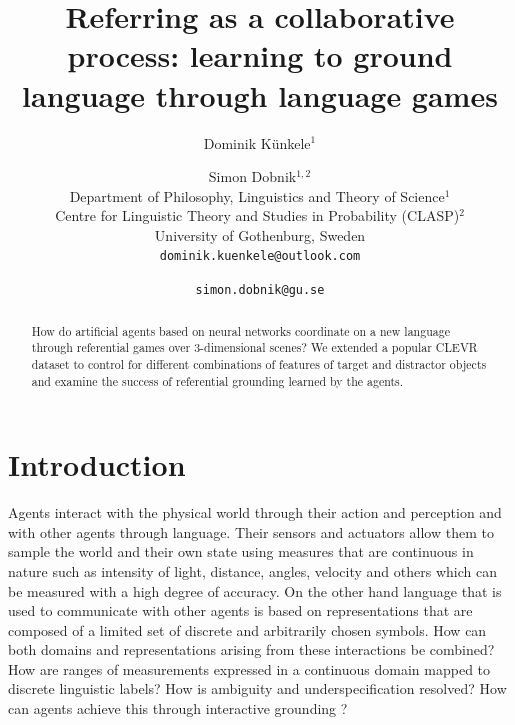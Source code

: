 \documentclass[11pt]{article}
\title{Referring as a collaborative process: learning to ground \\ language through language games} %
\author{Dominik Künkele$^{1}$ \and Simon Dobnik$^{1,2}$ \\
        Department of Philosophy, Linguistics and Theory of Science$^{1}$ \\ 
        Centre for Linguistic Theory and Studies in Probability (CLASP)$^{2}$ \\
        University of Gothenburg, Sweden \\
        \texttt{dominik.kuenkele@outlook.com} \and \texttt{simon.dobnik@gu.se}}
\begin{document}
\maketitle
\begin{abstract}
  How do artificial agents based on neural networks coordinate on a new language through referential games over 3-dimensional scenes?
  We extended a popular CLEVR dataset to control for different combinations of features of target and distractor objects and examine the success of referential grounding learned by the agents.
\end{abstract}

\section{Introduction}

Agents interact with the physical world through their action and perception and with other agents through language.
Their sensors and actuators %
allow them to sample the world and their own state using measures that are continuous in nature such as intensity of light, distance, angles, velocity and others which can be measured with a high degree of accuracy.
On the other hand language that is used to communicate with other agents is based on representations that are composed of a limited set of discrete and arbitrarily chosen symbols.
How can both domains and representations arising from these interactions be combined? How are ranges of measurements expressed in a continuous domain mapped to discrete linguistic labels?
How is ambiguity and underspecification resolved?
How can agents achieve this through interactive grounding \citep{Regier:1996,Roy:2005,Cooper:2023aa}?


\end{document}
